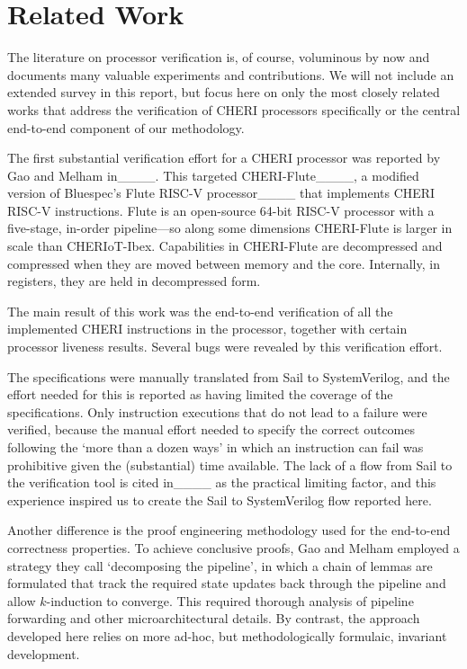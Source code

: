 \section{Related Work}
\label{sec:related}

The literature on processor verification is, of course, voluminous by now
and documents many valuable experiments and contributions. We will not
include an extended survey in this report, but focus here on only the most
closely related works that address the verification of CHERI processors
specifically or the central end-to-end component of our methodology.

The first substantial verification effort for a CHERI processor was
reported by Gao and Melham in____. This targeted
CHERI-Flute____, a modified version of Bluespec's
Flute RISC-V processor____ that implements CHERI
RISC-V instructions. Flute is an open-source 64-bit RISC-V processor with a
five-stage, in-order pipeline---so along some dimensions CHERI-Flute is
larger in scale than CHERIoT-Ibex. Capabilities in CHERI-Flute are
decompressed and compressed when they are moved between memory and the
core. Internally, in registers, they are held in decompressed form.

The main result of this work was the end-to-end verification of all the
implemented CHERI instructions in the processor, together with certain
processor liveness results.  Several bugs were revealed by this
verification effort.

The specifications were manually translated from Sail to SystemVerilog, and
the effort needed for this is reported as having limited the coverage of
the specifications. Only instruction executions that do not lead to a
failure were verified, because the manual effort needed to specify the
correct outcomes following the `more than a dozen ways' in which an
instruction can fail was prohibitive given the (substantial) time available.
The lack of a flow from Sail to the verification tool is cited
in____ as the practical limiting factor, and this
experience inspired us to create the Sail to SystemVerilog flow reported
here.

Another difference is the proof engineering methodology used
for the end-to-end correctness properties. To achieve conclusive proofs,
Gao and Melham employed a strategy they call `decomposing the pipeline', in
which a chain of lemmas are formulated that track the required state
updates back through the pipeline and allow $k$-induction to converge. This
required thorough analysis of pipeline forwarding and other
microarchitectural details. By contrast, the approach developed here relies
on more ad-hoc, but methodologically formulaic, invariant
development.

